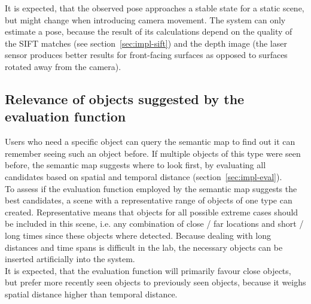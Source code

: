 It is expected, that the observed pose approaches a stable state for a static scene, but might change when introducing camera movement. The system can only estimate a pose, because the result of its calculations depend on the quality of the SIFT matches (see section~\ref{sec:impl-sift}) and the depth image (the laser sensor produces better results for front-facing surfaces as opposed to surfaces rotated away from the camera). \\




\subsection{Relevance of objects suggested by the evaluation function}
Users who need a specific object can query the semantic map to find out it can remember seeing such an object before. If multiple objects of this type were seen before, the semantic map suggests where to look first, by evaluating all candidates based on spatial and temporal distance (section~\ref{sec:impl-eval}). \\

To assess if the evaluation function employed by the semantic map suggests the best candidates, a scene with a representative range of objects of one type can created. Representative means that objects for all possible extreme cases should be included in this scene, i.e. any combination of close / far locations and short / long times since these objects where detected. Because dealing with long distances and time spans is difficult in the lab, the necessary objects can be inserted artificially into the system. \\

It is expected, that the evaluation function will primarily favour close objects, but prefer more recently seen objects to previously seen objects, because it weighs spatial distance higher than temporal distance.


